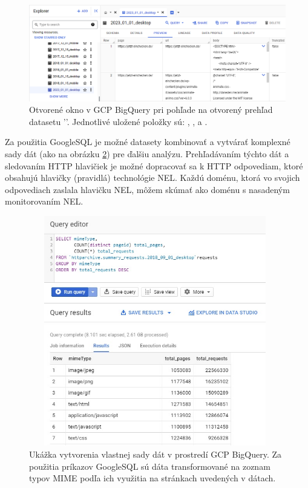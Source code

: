 \pagebreak

\begin{figure}[htb]
\begin{center}
 \includegraphics[scale=0.53]{obrazky-figures/bigquery_response_bodies.png}    
 \caption{\centering Otvorené okno v GCP BigQuery pri pohľade na otvorený prehľad datasetu ''. 
 Jednotlivé uložené položky sú: , ,  a .}
 \label{img:bigquery-example-table}
\end{center}
\end{figure}


Za použitia GoogleSQL je možné datasety kombinovať a vytvárať komplexné sady dát (ako na obrázku \ref{img:bigquery-example-query}) pre ďalšiu analýzu.
Prehľadávaním týchto dát a sledovaním HTTP hlavičiek je možné dopracovať sa k HTTP odpovediam, ktoré obsahujú hlavičky (pravidlá) technológie NEL.
Každú doménu, ktorá vo svojich odpovediach zaslala hlavičku NEL, môžem skúmať ako doménu s nasadeným monitorovaním NEL.

\begin{figure}[!htb]
\begin{center}
 \includegraphics[width=11cm, height=10.0125cm]{obrazky-figures/mimeType_summary_example_query.jpg}    
 \caption{\centering Ukážka vytvorenia vlastnej sady dát v prostredí GCP BigQuery. Za použitia príkazov GoogleSQL sú dáta transformované na zoznam typov MIME podľa ich využitia na stránkach uvedených v dátach.}
 \label{img:bigquery-example-query}
\end{center}
\end{figure}

